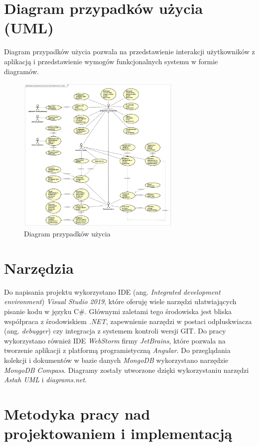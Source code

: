 \documentclass[a4paper,twoside,12pt]{book}
\newcommand{\obcy}[1]{\emph{#1}}
\newcommand{\ang}[1]{{\selectlanguage{british}\obcy{#1}}}
\begin{document}
	\section {Diagram przypadków użycia (UML)}
	Diagram przypadków użycia pozwala na przedstawienie interakcji użytkowników z aplikacją i przedstawienie wymogów funkcjonalnych systemu w formie diagramów.
	
\begin{figure}[H]
	\centering
	\includegraphics[width=0.7\textwidth]{diagram_przypadków_użycia.png}
	\caption{Diagram przypadków użycia}
	\label{fig:diagramPrzpydakowUzyciaUML}
\end{figure}
	
	\section{Narzędzia}
	Do napisania projektu wykorzystano IDE (ang. \ang{Integrated development environment}) \textit{Visual Studio 2019}, które oferuję wiele narzędzi ułatwiających pisanie kodu w języku C\#. Głównymi zaletami tego środowiska jest bliska współpraca z środowiskiem \textit{.NET}, zapewnienie narzędzi w postaci odpluskwiacza (ang. \ang{debugger}) czy integracja z systemem kontroli wersji GIT. Do pracy wykorzystano również IDE \textit{WebStorm} firmy \textit{JetBrains}, które pozwala na tworzenie aplikacji z platformą programistyczną \textit{Angular}. Do przeglądania kolekcji i dokumentów w bazie danych \textit{MongoDB} wykorzystano narzędzie \textit{MongoDB Compass}. Diagramy zostały utworzone dzięki wykorzystaniu narzędzi \textit{Astah UML} i \textit{diagrams.net}.
	
	\section {Metodyka pracy nad projektowaniem i implementacją}
	
\end{document}
